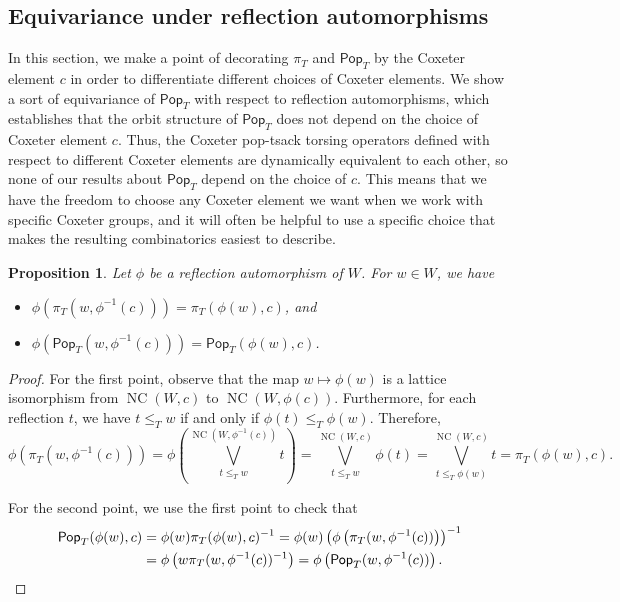 \documentclass[10pt,a4paper]{amsart}
\newtheorem{prop}[prop]{Proposition}
\newcommand{\pop}{\mathsf{Pop}}
\DeclareMathOperator{\NC}{NC}
\begin{document}
\subsection{Equivariance under reflection automorphisms}

In this section, we make a point of decorating $\pi_T$ and $\pop_T$ by the Coxeter element $c$ in order to differentiate different choices of Coxeter elements.  We show a sort of equivariance of $\pop_T$ with respect to reflection automorphisms, which establishes that the orbit structure of $\pop_T$ does not depend on the choice of Coxeter element $c$.  Thus, the Coxeter pop-tsack torsing operators defined with respect to different Coxeter elements are dynamically equivalent to each other, so none of our results about $\pop_T$ depend on the choice of $c$. This means that we have the freedom to choose any Coxeter element we want when we work with specific Coxeter groups, and it will often be helpful to use a specific choice that makes the resulting combinatorics easiest to describe.

\begin{prop}  Let $\phi$ be a reflection automorphism of $W$.
For $w \in W$, we have
\begin{itemize}
\item $\phi(\pi_T(w,\phi^{-1}(c))) = \pi_T(\phi(w),c)$, and
\item $\phi(\pop_T(w,\phi^{-1}(c))) = \pop_T(\phi(w),c)$.
\end{itemize}
\label{prop:pop_props}
\end{prop}

\begin{proof}
For the first point, observe that the map $w \mapsto \phi(w)$ is a lattice isomorphism from $\NC(W,c)$ to $\NC(W,\phi(c))$.  Furthermore, for each reflection $t$, we have $t \leq_T w$ if and only if $\phi(t) \leq_T \phi(w)$.  Therefore, 
\[
\phi\left(\pi_T(w,\phi^{-1}(c))\right) = \phi\left(\bigvee_{t \leq_T w}^{\NC(W,\phi^{-1}(c))} t\right) = \bigvee_{t \leq_T w}^{\NC(W,c)} \phi(t) = \bigvee_{t \leq_T \phi(w)}^{\NC(W,c)} t = \pi_T(\phi(w),c).\]  


For the second point, we use the first point to check that 
\begin{align*}\pop_T(\phi(w),c) &= \phi(w) \pi_T(\phi(w),c)^{-1} = \phi(w) \left(\phi\left(\pi_T(w,\phi^{-1}(c))\right)\right)^{-1}\\ & = \phi\left(w\pi_T(w,\phi^{-1}( c))^{-1}\right) = \phi\left(\pop_T(w,\phi^{-1}(c))\right) .\qedhere
\end{align*}
\end{proof}
\end{document}
